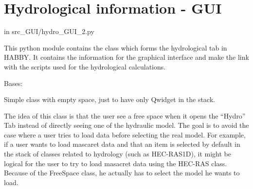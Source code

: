 \documentclass[letterpaper,10pt,english]{sphinxmanual}
\begin{document}

\begin{fulllineitems}
\label{\detokenize{index:src_GUI.Main_windows_1.open_project}}
\end{fulllineitems}



\section{Hydrological information - GUI}
\label{\detokenize{index:hydrological-information-gui}}
in src\_GUI/hydro\_GUI\_2.py

This python module contains the class which forms the hydrological tab in HABBY.
It contains the information for the graphical interface and make the link with the scripts
used for the hydrological calculations.
\label{\detokenize{index:module-src_GUI.hydro_GUI_2}}

\begin{fulllineitems}
\label{\detokenize{index:src_GUI.hydro_GUI_2.FreeSpace}}
Bases: 

Simple class with empty space, just to have only Qwidget in the stack.


The idea of this class is that the user see a free space when it opens the “Hydro” Tab instead
of directly seeing one of the hydraulic model. The goal is to avoid the case where a user tries to load data before
selecting the real model. For example, if a user wants to load mascaret data and that an item is selected by
default in the stack of classes related to hydrology (such as HEC-RAS1D), it might be logical for the user to try
to load masacret data using the HEC-RAS class. Because of the FreeSpace class, he actually has to select
the model he wants to load.

\end{fulllineitems}

\end{document}
